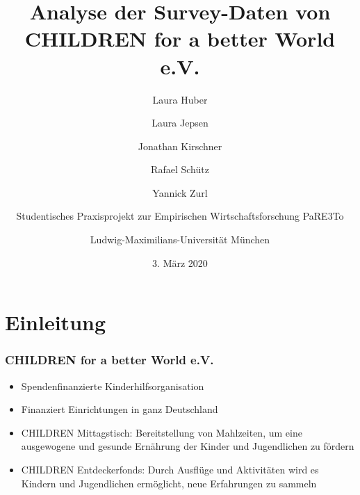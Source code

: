 




%





\title[Analyse der Survey-Daten von CHILDREN]{Analyse der Survey-Daten von CHILDREN for a better World e.V.
	}
\author[PaRE3To]{
Laura Huber\\
\and
Laura Jepsen\\
\and
Jonathan Kirschner\\
\and
Rafael Schütz\\
\and
Yannick Zurl\\
\and
Studentisches Praxisprojekt zur Empirischen Wirtschaftsforschung PaRE3To\\
\and
Ludwig-Maximilians-Universität München}
\date{3. März 2020}


\begin{frame}
	\maketitle
\end{frame}


\section{Einleitung}

\begin{frame}[fragile]
\frametitle{CHILDREN for a better World e.V.}
\begin{itemize}
 \item Spendenfinanzierte Kinderhilfsorganisation
 \item Finanziert Einrichtungen in ganz Deutschland
 \linebreak
 \item CHILDREN Mittagstisch: Bereitstellung von Mahlzeiten, um eine ausgewogene und gesunde Ernährung der Kinder und Jugendlichen zu fördern
 \item CHILDREN Entdeckerfonds: Durch Ausflüge und Aktivitäten wird es Kindern und Jugendlichen ermöglicht, neue Erfahrungen zu sammeln
\end{itemize}
\end{frame}


